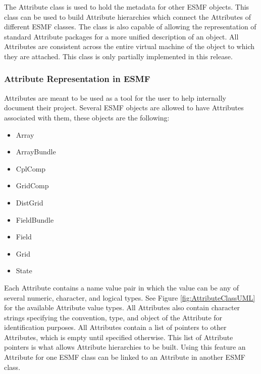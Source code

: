 %

The Attribute class is used to hold the metadata for other ESMF objects.  This class can be used to build Attribute hierarchies which connect the Attributes of different ESMF classes.  The class is also capable of allowing the representation of standard Attribute packages for a more unified description of an object.  All Attributes are consistent across the entire virtual machine of the object to which they are attached.  This class is only partially implemented in this release.

\subsubsection{Attribute Representation in ESMF}

Attributes are meant to be used as a tool for the user to help internally document their project.   Several ESMF objects are allowed to have Attributes associated with them, these objects are the following:

\begin{itemize}
\item Array
\item ArrayBundle
\item CplComp
\item GridComp
\item DistGrid
\item FieldBundle
\item Field
\item Grid
\item State
\end{itemize}

Each Attribute contains a name value pair in which the value can be any of several numeric, character, and logical types.  See Figure \ref{fig:AttributeClassUML} for the available Attribute value types.  All Attributes also contain character strings specifying the convention, type, and object of the Attribute for identification purposes.  All Attributes contain a list of pointers to other Attributes, which is empty until specified otherwise.  This list of Attribute pointers is what allows Attribute hierarchies to be built.  Using this feature an Attribute for one ESMF class can be linked to an Attribute in another ESMF class.

